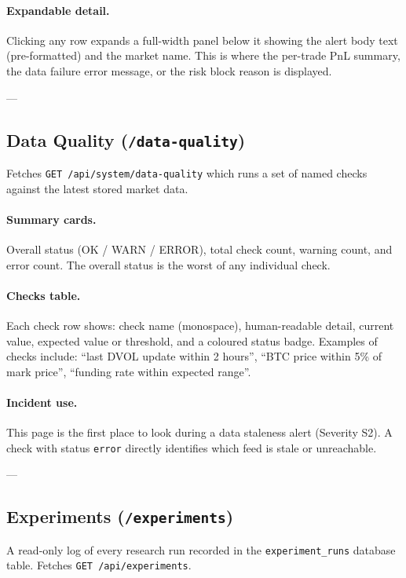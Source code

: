 \documentclass[12pt, a4paper]{article}
\begin{document}
\paragraph{Expandable detail.}
Clicking any row expands a full-width panel below it showing the alert
body text (pre-formatted) and the market name. This is where the
per-trade PnL summary, the data failure error message, or the risk block
reason is displayed.

---

\subsection{Data Quality (\texttt{/data-quality})}

Fetches \texttt{GET /api/system/data-quality} which runs a set of named
checks against the latest stored market data.

\paragraph{Summary cards.}
Overall status (OK / WARN / ERROR), total check count, warning count, and
error count. The overall status is the worst of any individual check.

\paragraph{Checks table.}
Each check row shows: check name (monospace), human-readable detail, current
value, expected value or threshold, and a coloured status badge. Examples of
checks include: ``last DVOL update within 2 hours'', ``BTC price within 5\%
of mark price'', ``funding rate within expected range''.

\paragraph{Incident use.}
This page is the first place to look during a data staleness alert
(Severity S2). A check with status \texttt{error} directly identifies
which feed is stale or unreachable.

---

\subsection{Experiments (\texttt{/experiments})}

A read-only log of every research run recorded in the \texttt{experiment\_runs}
database table. Fetches \texttt{GET /api/experiments}.
\end{document}
